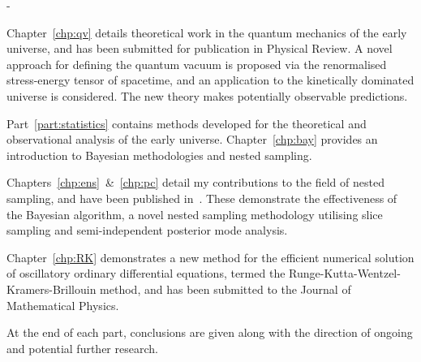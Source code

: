 \begin{adjustwidth*}{\unitlength}{-\unitlength}
\begin{titlingpage}
Chapter~\ref{chp:qv} details theoretical work in the quantum mechanics of the early universe, and has been submitted for publication in Physical Review. A novel approach for defining the quantum vacuum is proposed via the renormalised stress-energy tensor of spacetime, and an application to the kinetically dominated universe is considered. The new theory makes potentially observable predictions.

Part~\ref{part:statistics} contains methods developed for the theoretical and observational analysis of the early universe. Chapter~\ref{chp:bay} provides an introduction to Bayesian methodologies and nested sampling.

Chapters~\ref{chp:ens}~\&~\ref{chp:pc} detail my contributions to the field of nested sampling, and have been published in~\cite{polychordletter,polychordpaper}. These demonstrate the effectiveness of the Bayesian \PolyChord{} algorithm, a novel nested sampling methodology utilising slice sampling and semi-independent posterior mode analysis.

Chapter~\ref{chp:RK} demonstrates a new method for the efficient numerical solution of oscillatory ordinary differential equations, termed the Runge-Kutta-Wentzel-Kramers-Brillouin method, and has been submitted to the Journal of Mathematical Physics.

At the end of each part, conclusions are given along with the direction of ongoing and potential further research.



  \end{titlingpage}

\end{adjustwidth*}

